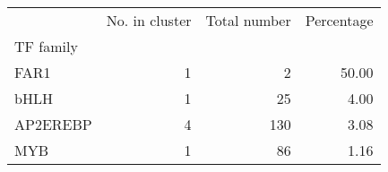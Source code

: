 \begin{tabular}{lrrr}
\toprule
{} &  No. in cluster &  Total number &  Percentage \\
TF family &                 &               &             \\
\midrule
FAR1      &               1 &             2 &       50.00 \\
bHLH      &               1 &            25 &        4.00 \\
AP2EREBP  &               4 &           130 &        3.08 \\
MYB       &               1 &            86 &        1.16 \\
\bottomrule
\end{tabular}
